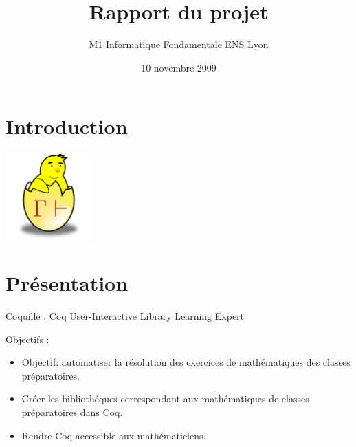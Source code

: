 \documentclass[slidetop]{beamer}
\date{10 novembre 2009}
\title{Rapport du projet \coquille{}}
\author{M1 Informatique Fondamentale ENS Lyon}
\begin{document}
\section{Introduction}
\begin{frame}
\maketitle
\center
\includegraphics[width=0.25\textwidth]{poussin.png}

\end{frame}

\begin{frame}
\tableofcontents

\end{frame}

\section{Présentation}
\begin{frame}
Coquille : Coq User-Interactive Library Learning Expert

Objectifs :
\begin{itemize}
  \item Objectif: automatiser la résolution des exercices de mathématiques des classes préparatoires.
  \item Créer les bibliothéques correspondant aux mathématiques de classes préparatoires dans Coq. 
  \item Rendre Coq accessible aux mathématiciens. %
\end{itemize}


\end{frame}
\end{document}
